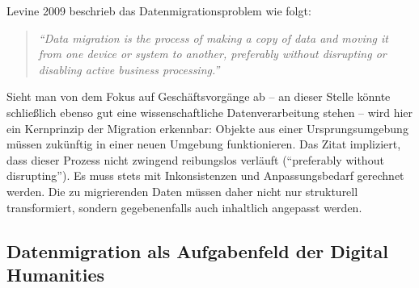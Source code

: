 \documentclass[a4paper,
fontsize=11pt,
oneside,
numbers=noperiodatend,
parskip=half-,
bibliography=totoc,
final
]{scrartcl}
\begin{document}
Levine 2009 beschrieb das Datenmigrationsproblem wie folgt:

\begin{quote}
\emph{\enquote{Data migration is the process of making a copy of data
and moving it from one device or system to another, preferably without
disrupting or disabling active business processing.}}
\end{quote}

Sieht man von dem Fokus auf Geschäftsvorgänge ab -- an dieser Stelle
könnte schließlich ebenso gut eine wissenschaftliche Datenverarbeitung
stehen -- wird hier ein Kernprinzip der Migration erkennbar: Objekte aus
einer Ursprungsumgebung müssen zukünftig in einer neuen Umgebung
funktionieren. Das Zitat impliziert, dass dieser Prozess nicht zwingend
reibungslos verläuft (\enquote{preferably without disrupting}). Es muss
stets mit Inkonsistenzen und Anpassungsbedarf gerechnet werden. Die zu
migrierenden Daten müssen daher nicht nur strukturell transformiert,
sondern gegebenenfalls auch inhaltlich angepasst werden.

\subsection*{Datenmigration als Aufgabenfeld der Digital
Humanities}\label{datenmigration-als-aufgabenfeld-der-digital-humanities}
\end{document}
